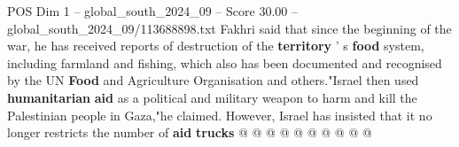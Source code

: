 \begin{textsample}{POS Dim 1 – global\_south\_2024\_09 – Score 30.00 – global\_south\_2024\_09/113688898.txt}
Fakhri said that since the beginning of the war, he has received reports of destruction of the \textbf{territory} ' s \textbf{food} system, including farmland and fishing, which also has been documented and recognised by the UN \textbf{Food} and Agriculture Organisation and others."Israel then used \textbf{humanitarian} \textbf{aid} as a political and military weapon to harm and kill the Palestinian people in Gaza,"he claimed.
However, Israel has insisted that it no longer restricts the number of \textbf{aid} \textbf{trucks} @ @ @ @ @ @ @ @ @ @

\end{textsample}
